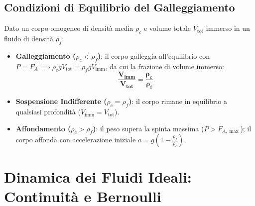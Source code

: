 \begin{center}
\end{center}

\subsection{Condizioni di Equilibrio del Galleggiamento}
Dato un corpo omogeneo di densità media $\rho_c$ e volume totale $V_{\text{tot}}$ immerso in un fluido di densità $\rho_f$:
\begin{itemize}
    \item \textbf{Galleggiamento ($\rho_c < \rho_f$)}: il corpo galleggia all'equilibrio con $P = F_A \implies \rho_c g V_{\text{tot}} = \rho_f g V_{\text{imm}}$, da cui la frazione di volume immerso:
    \begin{equation}
        \mathbf{\frac{V_{\text{imm}}}{V_{\text{tot}}} = \frac{\rho_c}{\rho_f}}
        \label{eq:frazione_immersa}
    \end{equation}
    \item \textbf{Sospensione Indifferente ($\rho_c = \rho_f$)}: il corpo rimane in equilibrio a qualsiasi profondità ($V_{\text{imm}} = V_{\text{tot}}$).
    \item \textbf{Affondamento ($\rho_c > \rho_f$)}: il peso supera la spinta massima ($P > F_{A,\max}$); il corpo affonda con accelerazione iniziale $a = g\left(1 - \frac{\rho_f}{\rho_c}\right)$.
\end{itemize}

\section{Dinamica dei Fluidi Ideali: Continuità e Bernoulli}
\label{sec:dinamica_fluidi}

